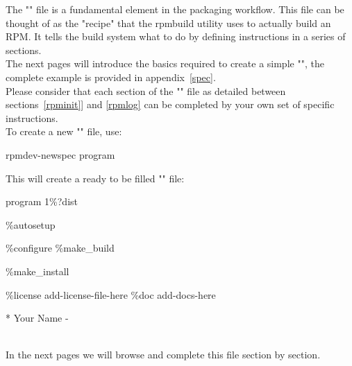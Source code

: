 The "" file is a fundamental element in the packaging workflow. 
This file can be thought of as the "recipe" that the rpmbuild utility uses to actually build an RPM. 
It tells the build system what to do by defining instructions in a series of sections. \\
The next pages will introduce the basics required to create a simple "", 
the complete example is provided in appendix~\ref{spec}. \\[0.25cm]
Please consider that each section of the "" file as detailed between sections~\ref{rpminit}] and \ref{rpmlog} 
can be completed by your own set of specific instructions. \\[0.25cm] 
\noindent To create a new "" file, use:
\begin{script}
\fprompt{~} rpmdev-newspec program
\end{script}
\clearpage
\noindent This will create a ready to be filled "" file: 
{\footnotesize{
\begin{script}
           program
        1\%{?dist}




\%autosetup

\%configure
\%make\_build

\%make\_install


\%license add-license-file-here
\%doc add-docs-here

*  Your Name \blue{<\email>}
- 
\end{script}
}}
\\
\noindent In the next pages we will browse and complete this file section by section.

